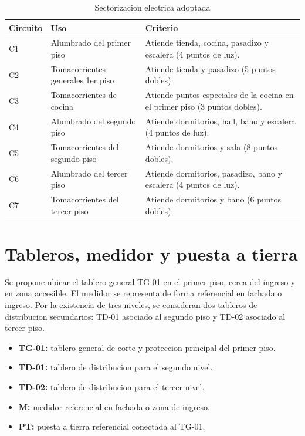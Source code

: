 \begin{table}[H]
\centering
\small
\caption{Sectorizacion electrica adoptada}
\label{tab:sectorizacion-adoptada}
\begin{tabularx}{\textwidth}{L{1.4cm}L{4.4cm}Y}
\toprule
\textbf{Circuito} & \textbf{Uso} & \textbf{Criterio} \\
\midrule
C1 & Alumbrado del primer piso & Atiende tienda, cocina, pasadizo y escalera (4 puntos de luz). \\
C2 & Tomacorrientes generales 1er piso & Atiende tienda y pasadizo (5 puntos dobles). \\
C3 & Tomacorrientes de cocina & Atiende puntos especiales de la cocina en el primer piso (3 puntos dobles). \\
C4 & Alumbrado del segundo piso & Atiende dormitorios, hall, bano y escalera (4 puntos de luz). \\
C5 & Tomacorrientes del segundo piso & Atiende dormitorios y sala (8 puntos dobles). \\
C6 & Alumbrado del tercer piso & Atiende dormitorios, pasadizo, bano y escalera (4 puntos de luz). \\
C7 & Tomacorrientes del tercer piso & Atiende dormitorios y bano (6 puntos dobles). \\
\bottomrule
\end{tabularx}
\end{table}

\section{Tableros, medidor y puesta a tierra}

Se propone ubicar el tablero general TG-01 en el primer piso, cerca del ingreso y en zona accesible. El medidor se representa de forma referencial en fachada o ingreso. Por la existencia de tres niveles, se consideran dos tableros de distribucion secundarios: TD-01 asociado al segundo piso y TD-02 asociado al tercer piso.

\begin{itemize}
  \item \textbf{TG-01:} tablero general de corte y proteccion principal del primer piso.
  \item \textbf{TD-01:} tablero de distribucion para el segundo nivel.
  \item \textbf{TD-02:} tablero de distribucion para el tercer nivel.
  \item \textbf{M:} medidor referencial en fachada o zona de ingreso.
  \item \textbf{PT:} puesta a tierra referencial conectada al TG-01.
\end{itemize}

